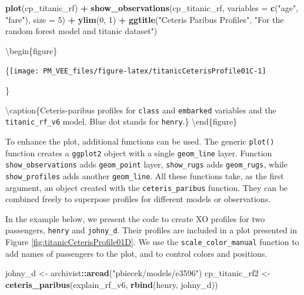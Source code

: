 \documentclass[12pt,]{krantz}
\newenvironment{Shaded}{\begin{snugshade}}{\end{snugshade}}
\newcommand{\DataTypeTok}[1]{\textcolor[rgb]{0.13,0.29,0.53}{#1}}
\newcommand{\DecValTok}[1]{\textcolor[rgb]{0.00,0.00,0.81}{#1}}
\newcommand{\KeywordTok}[1]{\textcolor[rgb]{0.13,0.29,0.53}{\textbf{#1}}}
\newcommand{\NormalTok}[1]{#1}
\newcommand{\OperatorTok}[1]{\textcolor[rgb]{0.81,0.36,0.00}{\textbf{#1}}}
\newcommand{\StringTok}[1]{\textcolor[rgb]{0.31,0.60,0.02}{#1}}
\theoremstyle{definition}
\theoremstyle{definition}
\theoremstyle{definition}
\theoremstyle{remark}
\begin{document}
\begin{Shaded}
\begin{Highlighting}[]
\KeywordTok{plot}\NormalTok{(cp_titanic_rf) }\OperatorTok{+}\StringTok{ }
\StringTok{  }\KeywordTok{show_observations}\NormalTok{(cp_titanic_rf, }\DataTypeTok{variables =} \KeywordTok{c}\NormalTok{(}\StringTok{"age"}\NormalTok{, }\StringTok{"fare"}\NormalTok{), }\DataTypeTok{size =} \DecValTok{5}\NormalTok{) }\OperatorTok{+}\StringTok{ }
\StringTok{  }\KeywordTok{ylim}\NormalTok{(}\DecValTok{0}\NormalTok{, }\DecValTok{1}\NormalTok{) }\OperatorTok{+}
\StringTok{  }\KeywordTok{ggtitle}\NormalTok{(}\StringTok{"Ceteris Paribus Profiles"}\NormalTok{, }\StringTok{"For the random forest model and titanic dataset"}\NormalTok{)}
\end{Highlighting}
\end{Shaded}

\textbackslash{}begin\{figure\}

\{\centering \texttt{[image: PM\_VEE\_files/figure-latex/titanicCeterisProfile01C-1]}

\}

\textbackslash{}caption\{Ceteris-paribus profiles for \texttt{class} and
\texttt{embarked} variables and the \texttt{titanic\_rf\_v6} model. Blue
dot stands for \texttt{henry}.\}\label{fig:titanicCeterisProfile01C}
\textbackslash{}end\{figure\}

To enhance the plot, additional functions can be used. The generic
\texttt{plot()} function creates a \texttt{ggplot2} object with a single
\texttt{geom\_line} layer. Function \texttt{show\_observations} adds
\texttt{geom\_point} layer, \texttt{show\_rugs} adds
\texttt{geom\_rugs}, while \texttt{show\_profiles} adds another
\texttt{geom\_line}. All these functions take, as the first argument, an
object created with the \texttt{ceteris\_paribus} function. They can be
combined freely to superpose profiles for different models or
observations.

In the example below, we present the code to create XO profiles for two
passengers, \texttt{henry} and \texttt{johny\_d}. Their profiles are
included in a plot presented in Figure
\ref{fig:titanicCeterisProfile01D}. We use the
\texttt{scale\_color\_manual} function to add names of passengers to the
plot, and to control colors and positions.

\begin{Shaded}
\begin{Highlighting}[]
\NormalTok{johny_d <-}\StringTok{ }\NormalTok{archivist}\OperatorTok{::}\KeywordTok{aread}\NormalTok{(}\StringTok{"pbiecek/models/e3596"}\NormalTok{)}
\NormalTok{cp_titanic_rf2 <-}\StringTok{ }\KeywordTok{ceteris_paribus}\NormalTok{(explain_rf_v6, }\KeywordTok{rbind}\NormalTok{(henry, johny_d))}
\end{Highlighting}
\end{Shaded}
\end{document}
